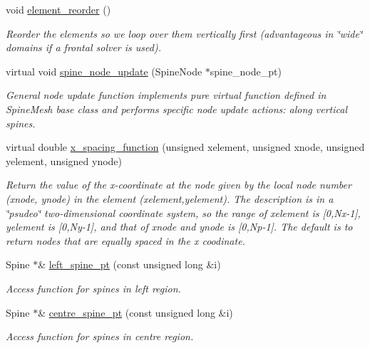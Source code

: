 \begin{DoxyCompactItemize}
void \hyperlink{classoomph_1_1ChannelSpineMesh_ad449460c4d06b2be64b53097143a3b09}{element\+\_\+reorder} ()
\begin{DoxyCompactList}\small\item\em Reorder the elements so we loop over them vertically first (advantageous in \char`\"{}wide\char`\"{} domains if a frontal solver is used). \end{DoxyCompactList}\item 
virtual void \hyperlink{classoomph_1_1ChannelSpineMesh_aefa38017e44e64ad0cd86d87d397bf8d}{spine\+\_\+node\+\_\+update} (Spine\+Node $\ast$spine\+\_\+node\+\_\+pt)
\begin{DoxyCompactList}\small\item\em General node update function implements pure virtual function defined in Spine\+Mesh base class and performs specific node update actions\+: along vertical spines. \end{DoxyCompactList}\item 
virtual double \hyperlink{classoomph_1_1ChannelSpineMesh_a16e0d4264443b1beb274753b0d6b970e}{x\+\_\+spacing\+\_\+function} (unsigned xelement, unsigned xnode, unsigned yelement, unsigned ynode)
\begin{DoxyCompactList}\small\item\em Return the value of the x-\/coordinate at the node given by the local node number (xnode, ynode) in the element (xelement,yelement). The description is in a \char`\"{}psudeo\char`\"{} two-\/dimensional coordinate system, so the range of xelement is \mbox{[}0,Nx-\/1\mbox{]}, yelement is \mbox{[}0,Ny-\/1\mbox{]}, and that of xnode and ynode is \mbox{[}0,Np-\/1\mbox{]}. The default is to return nodes that are equally spaced in the x coodinate. \end{DoxyCompactList}\item 
Spine $\ast$\& \hyperlink{classoomph_1_1ChannelSpineMesh_ad4ae203f8a69fa3c8f0541ede45d7630}{left\+\_\+spine\+\_\+pt} (const unsigned long \&i)
\begin{DoxyCompactList}\small\item\em Access function for spines in left region. \end{DoxyCompactList}\item 
Spine $\ast$\& \hyperlink{classoomph_1_1ChannelSpineMesh_a690cda061ec45945d981a24a2b206e69}{centre\+\_\+spine\+\_\+pt} (const unsigned long \&i)
\begin{DoxyCompactList}\small\item\em Access function for spines in centre region. \end{DoxyCompactList}\item 

\end{DoxyCompactItemize}
